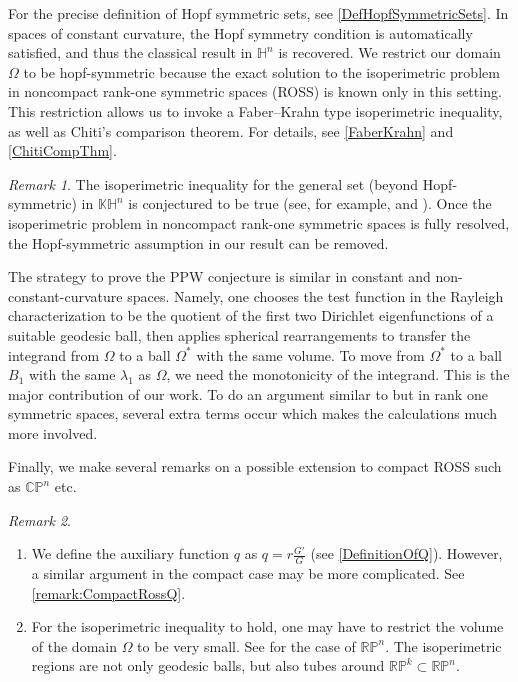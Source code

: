 \documentclass{amsart}
\numberwithin{equation}{section}
\theoremstyle{plain}
\theoremstyle{definition}
\theoremstyle{remark}
\newtheorem{remark}{Remark}[section]
\def\RR {\mathbb{R}}
\def\KK {\mathbb{K}}
\def\CC {\mathbb{C}}
\def\HH {\mathbb{H}}
\def\PP {\mathbb{P}}
\begin{document}
For the precise definition of Hopf symmetric sets, see \cref{DefHopfSymmetricSets}. In spaces of constant curvature, the Hopf symmetry condition is automatically satisfied, and thus the classical result in $\HH^n$ is recovered. We restrict our domain $\Omega$ to be hopf-symmetric because the exact solution to the isoperimetric problem in noncompact rank-one symmetric spaces (ROSS) is known only in this setting. This restriction allows us to invoke a Faber–Krahn type isoperimetric inequality, as well as Chiti’s comparison theorem. For details, see \cref{FaberKrahn} and \cref{ChitiCompThm}.
\begin{remark}
 The isoperimetric inequality for the general set (beyond Hopf-symmetric) in $\KK\HH^n$ is conjectured to be true (see, for example, \cite[335]{GromovMisha2007MSfR} and \cite[Question 112, p. 339]{Berger2003RiemGeo}). Once the isoperimetric problem in noncompact rank-one symmetric spaces is fully resolved, the Hopf-symmetric assumption in our result can be removed.
\end{remark}


The strategy to prove the PPW conjecture is similar in constant and non-constant-curvature spaces\cite{ashbaugh1992sharp,ashbaugh2001sharp,benguria2007second,edelen2017ppw}. Namely, one chooses the test function in the Rayleigh characterization to be the quotient of the first two Dirichlet eigenfunctions of a suitable geodesic ball, then applies spherical rearrangements to transfer the integrand from $\Omega$ to a ball $\Omega^*$ with the same volume. To move from $\Omega^*$ to a ball $B_1$ with the same $\lambda_1$ as $\Omega$, we need the monotonicity of the integrand. This is the major contribution of our work. To do an argument similar to \cite{benguria2007second} but in rank one symmetric spaces, several extra terms occur which makes the calculations much more involved. %

\par Finally, we make several remarks on a possible extension to compact ROSS such as $\CC\mathbb{P}^n$ etc.
\begin{remark}\label{Remark:ExtensionToCompactROSS}
    \begin{enumerate}
    \item We define the auxiliary function $q$ as $q=r\frac{G'}{G}$ (see \cref{DefinitionOfQ}). However, a similar argument in the compact case may be more complicated. See \cref{remark:CompactRossQ}.
    \item For the isoperimetric inequality to hold, one may have to restrict the volume of the domain $\Omega$ to be very small. See \cite{VianaCelso2023Iavp} for the case of $\RR\mathbb{P}^n$. The isoperimetric regions are not only geodesic balls, but also tubes around $\RR\PP^k\subset \RR\PP^n$.
\end{enumerate}
\end{remark}
\end{document}
